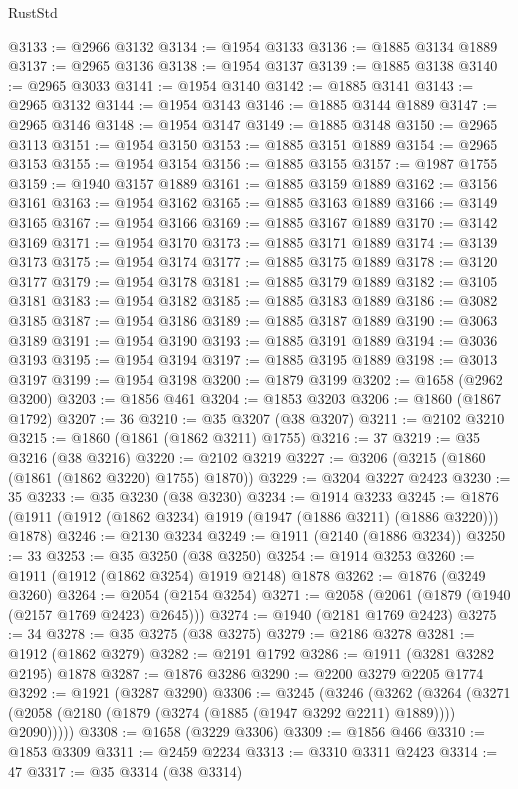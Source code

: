 \begin{lexlean}{RustStd}
\begin{coremodule}
@3133 := @2966 @3132
@3134 := @1954 @3133
@3136 := @1885 @3134 @1889
@3137 := @2965 @3136
@3138 := @1954 @3137
@3139 := @1885 @3138
@3140 := @2965 @3033
@3141 := @1954 @3140
@3142 := @1885 @3141
@3143 := @2965 @3132
@3144 := @1954 @3143
@3146 := @1885 @3144 @1889
@3147 := @2965 @3146
@3148 := @1954 @3147
@3149 := @1885 @3148
@3150 := @2965 @3113
@3151 := @1954 @3150
@3153 := @1885 @3151 @1889
@3154 := @2965 @3153
@3155 := @1954 @3154
@3156 := @1885 @3155
@3157 := @1987 @1755
@3159 := @1940 @3157 @1889
@3161 := @1885 @3159 @1889
@3162 := @3156 @3161
@3163 := @1954 @3162
@3165 := @1885 @3163 @1889
@3166 := @3149 @3165
@3167 := @1954 @3166
@3169 := @1885 @3167 @1889
@3170 := @3142 @3169
@3171 := @1954 @3170
@3173 := @1885 @3171 @1889
@3174 := @3139 @3173
@3175 := @1954 @3174
@3177 := @1885 @3175 @1889
@3178 := @3120 @3177
@3179 := @1954 @3178
@3181 := @1885 @3179 @1889
@3182 := @3105 @3181
@3183 := @1954 @3182
@3185 := @1885 @3183 @1889
@3186 := @3082 @3185
@3187 := @1954 @3186
@3189 := @1885 @3187 @1889
@3190 := @3063 @3189
@3191 := @1954 @3190
@3193 := @1885 @3191 @1889
@3194 := @3036 @3193
@3195 := @1954 @3194
@3197 := @1885 @3195 @1889
@3198 := @3013 @3197
@3199 := @1954 @3198
@3200 := @1879 @3199
@3202 := @1658 (@2962 @3200)
@3203 := @1856 @461
@3204 := @1853 @3203
@3206 := @1860 (@1867 @1792)
@3207 := 36
@3210 := @35 @3207 (@38 @3207)
@3211 := @2102 @3210
@3215 := @1860 (@1861 (@1862 @3211) @1755)
@3216 := 37
@3219 := @35 @3216 (@38 @3216)
@3220 := @2102 @3219
@3227 := @3206 (@3215 (@1860 (@1861 (@1862 @3220) @1755) @1870))
@3229 := @3204 @3227 @2423
@3230 := 35
@3233 := @35 @3230 (@38 @3230)
@3234 := @1914 @3233
@3245 := @1876 (@1911 (@1912 (@1862 @3234) @1919 (@1947 (@1886 @3211) (@1886 @3220))) @1878)
@3246 := @2130 @3234
@3249 := @1911 (@2140 (@1886 @3234))
@3250 := 33
@3253 := @35 @3250 (@38 @3250)
@3254 := @1914 @3253
@3260 := @1911 (@1912 (@1862 @3254) @1919 @2148) @1878
@3262 := @1876 (@3249 @3260)
@3264 := @2054 (@2154 @3254)
@3271 := @2058 (@2061 (@1879 (@1940 (@2157 @1769 @2423) @2645)))
@3274 := @1940 (@2181 @1769 @2423)
@3275 := 34
@3278 := @35 @3275 (@38 @3275)
@3279 := @2186 @3278
@3281 := @1912 (@1862 @3279)
@3282 := @2191 @1792
@3286 := @1911 (@3281 @3282 @2195) @1878
@3287 := @1876 @3286
@3290 := @2200 @3279 @2205 @1774
@3292 := @1921 (@3287 @3290)
@3306 := @3245
    (@3246
      (@3262
        (@3264 (@3271 (@2058 (@2180 (@1879 (@3274 (@1885 (@1947 @3292 @2211) @1889)))) @2090)))))
@3308 := @1658 (@3229 @3306)
@3309 := @1856 @466
@3310 := @1853 @3309
@3311 := @2459 @2234
@3313 := @3310 @3311 @2423
@3314 := 47
@3317 := @35 @3314 (@38 @3314)

\end{coremodule}
\end{lexlean}
